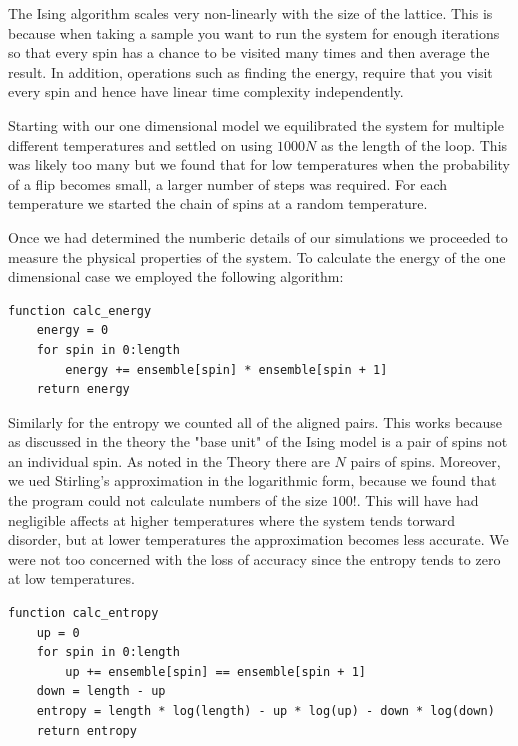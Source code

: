 \documentclass[a4paper]{article}
\begin{document}
\begin{multicols}{2}
        The Ising algorithm scales very non-linearly with the size of %
        the lattice. This is because when taking a sample you want to run %
        the system for enough iterations so that every spin has a chance %
        to be visited many times and then average the result. In addition, %
        operations such as finding the energy, require that you visit every %
        spin and hence have linear time complexity independently. 


        Starting with our one dimensional model we equilibrated the %
        system for multiple different temperatures and settled on %
        using \(1000N\) as the length of the loop. This was likely %
        too many but we found that for low temperatures when the %
        probability of a flip becomes small, a larger number of %
        steps was required. For each temperature we started the chain %
        of spins at a random temperature. 


        Once we had determined the numberic details of our simulations %
        we proceeded to measure the physical properties of the system. %
        To calculate the energy of the one dimensional case we employed %
        the following algorithm:
        \begin{verbatim}
function calc_energy
    energy = 0
    for spin in 0:length
        energy += ensemble[spin] * ensemble[spin + 1]
    return energy
        \end{verbatim}
        

        Similarly for the entropy we counted all of the aligned pairs. %
        This works because as discussed in the theory the "base unit" %
        of the Ising model is a pair of spins not an individual spin. %
        As noted in the Theory there are \(N\) pairs of spins. Moreover, %
        we ued Stirling's approximation in the logarithmic form, because %
        we found that the program could not calculate numbers of the size %
        \(100!\). This will have had negligible affects at higher %
        temperatures where the system tends torward disorder, but at %
        lower temperatures the approximation becomes less accurate. %
        We were not too concerned with the loss of accuracy since the %
        entropy tends to zero at low temperatures.
        \begin{verbatim}
function calc_entropy
    up = 0
    for spin in 0:length
        up += ensemble[spin] == ensemble[spin + 1]
    down = length - up
    entropy = length * log(length) - up * log(up) - down * log(down)
    return entropy
        \end{verbatim}



\end{multicols}
\end{document}
